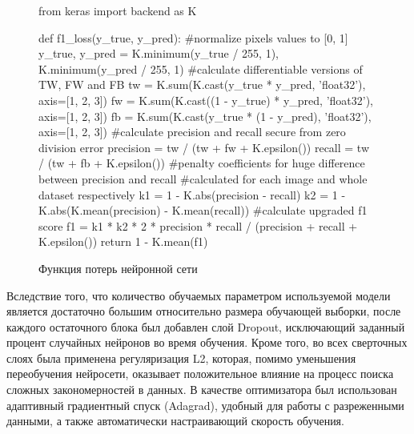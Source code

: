 \begin{figure}[h]
\begin{center}
\centering
\begin{python}
from keras import backend as K

def f1_loss(y_true, y_pred):
    #normalize pixels values to [0, 1]
    y_true, y_pred = K.minimum(y_true / 255, 1), K.minimum(y_pred / 255, 1)
    #calculate differentiable versions of TW, FW and FB
    tw = K.sum(K.cast(y_true * y_pred, 'float32'), axis=[1, 2, 3])
    fw = K.sum(K.cast((1 - y_true) * y_pred, 'float32'), axis=[1, 2, 3])
    fb = K.sum(K.cast(y_true * (1 - y_pred), 'float32'), axis=[1, 2, 3])
    #calculate precision and recall secure from zero division error
    precision = tw / (tw + fw + K.epsilon())
    recall = tw / (tw + fb + K.epsilon())
    #penalty coefficients for huge difference between precision and recall 
    #calculated for each image and whole dataset respectively
    k1 = 1 -  K.abs(precision - recall)
    k2 = 1 -  K.abs(K.mean(precision) - K.mean(recall))
    #calculate upgraded f1 score
    f1 = k1 * k2 * 2 * precision * recall / (precision + recall + K.epsilon()) 
    return 1 - K.mean(f1)
\end{python}
\caption{Функция потерь нейронной сети}
\label{loss}
\end{center}
\end{figure} 

Вследствие того, что количество обучаемых параметром используемой модели является достаточно большим относительно размера обучающей выборки, после каждого остаточного блока был добавлен слой Dropout, исключающий заданный процент случайных нейронов во время обучения. Кроме того, во всех сверточных слоях была применена регуляризация L2, которая, помимо уменьшения переобучения нейросети, оказывает положительное влияние на процесс поиска сложных закономерностей в данных. В качестве оптимизатора был использован адаптивный градиентный спуск (Adagrad), удобный для работы с разреженными данными, а также автоматически настраивающий скорость обучения.

